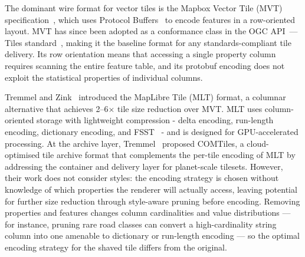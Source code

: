 The dominant wire format for vector tiles is the Mapbox Vector Tile (MVT) specification~\cite{Vectortilespec21Master}, which uses Protocol Buffers~\cite{ProtocolBuffers} to encode features in a row-oriented layout.
MVT has since been adopted as a conformance class in the OGC API~--- Tiles standard~\cite{ogcApiTiles2022}, making it the baseline format for any standards-compliant tile delivery.
Its row orientation means that accessing a single property column requires scanning the entire feature table, and its protobuf encoding does not exploit the statistical properties of individual columns.

Tremmel and Zink~\cite{tremmelMapLibreTileNext2025} introduced the MapLibre Tile (MLT) format, a columnar alternative that achieves 2--6$\times$ tile size reduction over MVT.
MLT uses column-oriented storage with lightweight compression - delta encoding, run-length encoding, dictionary encoding, and \ac{FSST}~\cite{bonczFSSTFastRandom2020} - and is designed for GPU-accelerated processing.
At the archive layer, Tremmel~\cite{tremmelCOMTilesCloudOptimized2023} proposed COMTiles, a cloud-optimised tile archive format that complements the per-tile encoding of MLT by addressing the container and delivery layer for planet-scale tilesets.
However, their work does not consider styles: the encoding strategy is chosen without knowledge of which properties the renderer will actually access, leaving potential for further size reduction through style-aware pruning before encoding.
Removing properties and features changes column cardinalities and value distributions --- for instance, pruning rare road classes can convert a high-cardinality string column into one amenable to dictionary or run-length encoding --- so the optimal encoding strategy for the shaved tile differs from the original.

